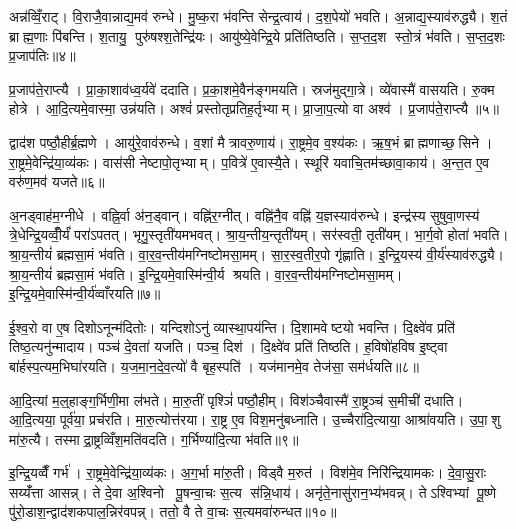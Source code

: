 अन्न॑व्विँ॒राट्। वि॒राजै॒वान्नाद्य॒मव॑ रुन्धे। मु॒ष्क॒रा भ॑वन्ति सेन्द्र॒त्वाय॑। द॒श॒पेयो॑ भवति। अ॒न्नाद्य॒स्याव॑रुद्ध्यै। श॒तं ब्राह्म॒णाः पि॑बन्ति। श॒तायु॒ पुरु॑षश्श॒तेन्द्रि॑यः। आयु॑ष्ये॒वेन्द्रि॒ये प्रति॑तिष्ठति। स॒प्त॒द॒श स्तो॒त्रं भ॑वति। स॒प्त॒द॒शः प्र॒जाप॑तिः॥४॥

प्र॒जाप॑ते॒राप्त्यै। प्रा॒का॒शाव॑ध्व॒र्यवे॑ ददाति। प्र॒का॒शमे॒वैन॑ङ्गमयति। स्रज॑मुद्गा॒त्रे। व्ये॑वास्मै॑ वासयति। रु॒क्म होत्रे। आ॒दि॒त्यमे॒वास्मा॒ उन्न॑यति। अश्वं॑ प्रस्तोतृप्रतिह॒र्तृभ्याम्। प्रा॒जा॒प॒त्यो वा अश्व॑। प्र॒जाप॑ते॒राप्त्यै॥५॥

द्वाद॑श पष्ठौ॒हीर्ब्र॒ह्मणे। आयु॑रे॒वाव॑रुन्धे। व॒शां मैत्रावरु॒णाय॑। रा॒ष्ट्रमे॒व व॒श्य॑कः। ऋ॒ष॒भं ब्राह्मणाच्छ॒सिने। रा॒ष्ट्रमे॒वेन्द्रि॑या॒व्य॑कः। वास॑सी नेष्टापो॒तृभ्याम्। प॒वित्रे॑ ए॒वास्यै॒ते। स्थूरि॑ यवाचि॒तम॑च्छावा॒काय॑। अ॒न्त॒त ए॒व वरु॑ण॒मव॑ यजते॥६॥

अ॒नड्वाह॑म॒ग्नीधे। वह्नि॒र्वा अ॑न॒ड्वान्। वह्नि॑र॒ग्नीत्। वह्नि॑नै॒व वह्नि॑ य॒ज्ञस्याव॑रुन्धे। इन्द्र॑स्य सुषुवा॒णस्य॑ त्रे॒धेन्द्रि॒यव्वीँ॒र्यं॑ परा॑ऽपतत्। भृगु॒स्तृती॑यमभवत्। श्रा॒य॒न्तीय॒न्तृती॑यम्। सर॑स्वती॒ तृती॑यम्। भा॒र्ग॒वो होता॑ भवति। श्रा॒य॒न्तीयं॑ ब्रह्मसा॒मं भ॑वति। वा॒र॒व॒न्तीय॑मग्निष्टोमसा॒मम्। सा॒र॒स्व॒तीर॒पो गृ॑ह्णाति। इ॒न्द्रि॒यस्य॑ वी॒र्य॑स्याव॑रुद्ध्यै। श्रा॒य॒न्तीयं॑ ब्रह्मसा॒मं भ॑वति। इ॒न्द्रि॒यमे॒वास्मि॑न्वी॒र्य श्रयति। वा॒र॒व॒न्तीय॑मग्निष्टोमसा॒मम्। इ॒न्द्रि॒यमे॒वास्मि॑न्वी॒र्य॑व्वाँरयति॥७॥\anuvakamend[वि॒राट्प्र॒जाप॑ति॒रश्व॑ प्र॒जाप॑ते॒राप्त्यै॑ यजते ब्रह्मसा॒मं भ॑वति स॒प्त च॑]

ई॒श्व॒रो वा ए॒ष दिशोऽनून्म॑दितोः। यन्दिशोऽनु॑ व्यास्था॒पय॑न्ति। दि॒शामवेष्टयो भवन्ति। दि॒क्ष्वे॑व प्रति॑ तिष्ठ॒त्यनु॑न्मादाय। पञ्च॑ दे॒वता॑ यजति। पञ्च॒ दिश॑। दि॒क्ष्वे॑व प्रति॑ तिष्ठति। ह॒विषो॑हविष इ॒ष्ट्वा बा॑र्\mbox{}हस्प॒त्यम॒भिघा॑रयति। य॒ज॒मा॒न॒दे॒व॒त्यो॑ वै बृह॒स्पति॑। यज॑मानमे॒व तेज॑सा॒ सम॑र्धयति॥८॥

आ॒दि॒त्यां म॒ल्॒हाङ्ग॒र्भिणी॒मा ल॑भते। मा॒रु॒तीं पृश्ञिं॑ पष्ठौ॒हीम्। विश॑ञ्चैवास्मै॑ रा॒ष्ट्रञ्च॑ स॒मीची॑ दधाति। आ॒दि॒त्यया॒ पूर्व॑या॒ प्रच॑रति। मा॒रु॒त्योत्त॑रया। रा॒ष्ट्र ए॒व विश॒मनु॑बध्नाति। उ॒च्चैरा॑दि॒त्याया॒ आश्रा॑वयति। उ॒पा॒शु मा॑रु॒त्यै। तस्माद्रा॒ष्ट्रव्विँश॒मति॑वदति। ग॒र्भिण्या॑दि॒त्या भ॑वति॥९॥

इ॒न्द्रि॒यव्वैँ गर्भ॑। रा॒ष्ट्रमे॒वेन्द्रि॑या॒व्य॑कः। अ॒ग॒र्भा मा॑रु॒ती। विड्वै म॒रुत॑। विश॑मे॒व निरि॑न्द्रियामकः। दे॒वा॒सु॒राः सय्यँ॑त्ता आसन्न्। ते दे॒वा अ॒श्विनो पू॒षन्वा॒चः स॒त्य स॑न्नि॒धाय॑। अनृ॑ते॒नासु॑रान॒भ्य॑भवन्न्। तेऽश्विभ्यां पू॒ष्णे पु॑रो॒डाश॒न्द्वाद॑शकपाल॒न्निर॑वपन्न्। ततो॒ वै ते वा॒चः स॒त्यमवा॑रुन्धत॥१०॥

